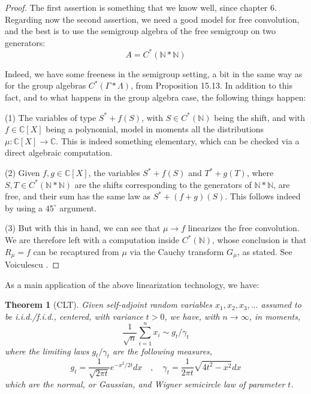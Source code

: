 \documentclass[12pt]{amsbook}
\newtheorem{theorem}{Theorem}[chapter]
\begin{document}
\begin{proof}
The first assertion is something that we know well, since chapter 6. Regarding now the second assertion, we need a good model for free convolution, and the best is to use the semigroup algebra of the free semigroup on two generators:
$$A=C^*(\mathbb N*\mathbb N)$$

Indeed, we have some freeness in the semigroup setting, a bit in the same way as for the group algebras $C^*(\Gamma*\Lambda)$, from Proposition 15.13. In addition to this fact, and to what happens in the group algebra case, the following things happen:

\medskip

(1) The variables of type $S^*+f(S)$, with $S\in C^*(\mathbb N)$ being the shift, and with $f\in\mathbb C[X]$ being a polynomial, model in moments all the distributions $\mu:\mathbb C[X]\to\mathbb C$. This is indeed something elementary, which can be checked via a direct algebraic computation.

\medskip

(2) Given $f,g\in\mathbb C[X]$, the variables $S^*+f(S)$ and $T^*+g(T)$, where $S,T\in C^*(\mathbb N*\mathbb N)$ are the shifts corresponding to the generators of $\mathbb N*\mathbb N$, are free, and their sum has the same law as $S^*+(f+g)(S)$. This follows indeed by using a $45^\circ$ argument.

\medskip

(3) But with this in hand, we can see that $\mu\to f$ linearizes the free convolution. We are therefore left with a computation inside $C^*(\mathbb N)$, whose conclusion is that $R_\mu=f$ can be recaptured from $\mu$ via the Cauchy transform $G_\mu$, as stated. See Voiculescu \cite{vdn}.
\end{proof}

As a main application of the above linearization technology, we have:


\begin{theorem}[CLT]
Given self-adjoint random variables $x_1,x_2,x_3,\ldots$ assumed to be i.i.d./f.i.d., centered, with variance $t>0$, we have, with $n\to\infty$, in moments,
$$\frac{1}{\sqrt{n}}\sum_{i=1}^nx_i\sim g_t/\gamma_t$$
where the limiting laws $g_t/\gamma_t$ are the following measures,
$$g_t=\frac{1}{\sqrt{2\pi t}}e^{-x^2/2t}dx\quad,\quad 
\gamma_t=\frac{1}{2\pi t}\sqrt{4t^2-x^2}dx$$
which are the normal, or Gaussian, and Wigner semicircle law of parameter $t$.
\end{theorem}
\end{document}
